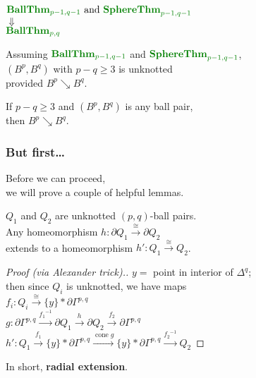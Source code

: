 \documentclass[14pt]{beamer}
\newcommand{\collapses}{\searrow}
\newcommand{\join}{\ast}
\newcommand{\BallThm}[1]{\mbox{$\textcolor{green!50!black}{\mbox{\textbf{BallThm}}_{#1}}$}}
\newcommand{\SphereThm}[1]{\mbox{$\textcolor{green!50!black}{\mbox{\textbf{SphereThm}}_{#1}}$}}
\DeclareMathOperator{\cone}{cone}
\begin{document}
\begin{frame}
  \begin{center}
 $\BallThm{p-1,q-1} \mbox{ and } \SphereThm{p-1,q-1}$ \\
 $\Downarrow$ \\
 $\BallThm{p,q}$
\end{center}
\vfill\pause
\begin{lemma}
 Assuming $\BallThm{p-1,q-1}$ and $\SphereThm{p-1,q-1}$, \\
 $(B^p,B^q)$ with $p-q \geq 3$ is unknotted \\
 provided $B^p \collapses B^q$.
\end{lemma}
\vfill\pause
\begin{lemma}
 If $p - q \geq 3$ and $(B^p,B^q)$ is any ball pair, \\
 then $B^p \collapses B^q$.
\end{lemma}

\end{frame}

\begin{frame}
  \frametitle{But first\ldots}

  \vfill\large
  Before we can proceed, \\
  we will prove a couple of helpful lemmas.
  \vfill

\end{frame}

\begin{frame}
  \begin{lemma}
    $Q_1$ and $Q_2$ are unknotted $(p,q)$-ball pairs. \\
    Any homeomorphism $h : \partial Q_1 \stackrel{\cong}{\longrightarrow} \partial Q_2$ \\
    extends to a homeomorphism $h' : Q_1 \stackrel{\cong}{\longrightarrow} Q_2$.
  \end{lemma}
  \pause
  \begin{proof}[Proof (via \textit{Alexander trick}).]
    $y = $ point in interior of $\Delta^q$; \\
    then since $Q_i$ is unknotted, we have maps \\
    $f_i : Q_i \stackrel{\cong}{\longrightarrow} \{y\} \join \partial
    \Gamma^{p,q}$ \\  \pause
    \vspace{1ex}$g : \partial \Gamma^{p,q} \stackrel{{f_1}^{-1}}{\longrightarrow} \partial Q_1 \stackrel{h}{\longrightarrow} \partial Q_2
    \stackrel{f_2}{\longrightarrow} \partial \Gamma^{p,q}$ \\  \pause
    \vspace{1ex}$h' : Q_1 \stackrel{f_1}{\longrightarrow} \{y\} \join \partial
    \Gamma^{p,q} \stackrel{\cone g}{\longrightarrow} \{y\} \join \partial
    \Gamma^{p,q} \stackrel{{f_2}^{-1}}{\longrightarrow} Q_2$
\end{proof}
In short, \textbf{radial extension}.
\end{frame}
\end{document}
